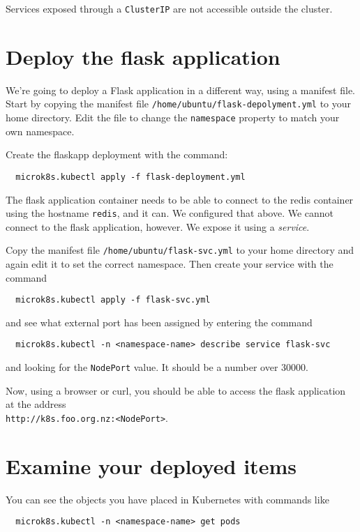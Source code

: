 \documentclass{article}
\begin{document}
Services exposed through a \texttt{ClusterIP} are not accessible outside the cluster.

\section{Deploy the flask application}
We're going to deploy a Flask application in a different way, using a manifest file. Start by copying the manifest file \texttt{/home/ubuntu/flask-depolyment.yml} to your home directory. Edit the file to change the \texttt{namespace} property to match your own namespace.

Create the flaskapp deployment with the command:
\begin{verbatim}
  microk8s.kubectl apply -f flask-deployment.yml
\end{verbatim}

The flask application container needs to be able to connect to the redis container using the hostname \texttt{redis}, and it can. We configured that above. We cannot connect to the flask application, however. We expose it using a \emph{service}. 

Copy the manifest file \texttt{/home/ubuntu/flask-svc.yml} to your home directory and again edit it to set the correct namespace. Then create your service with the command

\begin{verbatim}
  microk8s.kubectl apply -f flask-svc.yml
\end{verbatim}

and see what external port has been assigned by entering the command
\begin{verbatim}
  microk8s.kubectl -n <namespace-name> describe service flask-svc
\end{verbatim}

and looking for the \texttt{NodePort} value. It should be a number over 30000.

Now, using a browser or curl, you should be able to access the flask application at the address \\
\texttt{http://k8s.foo.org.nz:<NodePort>}. 


\section{Examine your deployed items}
You can see the objects you have placed in Kubernetes with commands like

\begin{verbatim}
  microk8s.kubectl -n <namespace-name> get pods
\end{verbatim}
\end{document}
